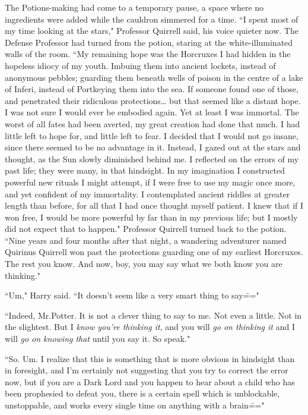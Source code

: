 The Potions-making had come to a temporary pause, a space where no ingredients were added while the cauldron simmered for a time. ``I spent most of my time looking at the stars," Professor Quirrell said, his voice quieter now. The Defense Professor had turned from the potion, staring at the white-illuminated walls of the room. ``My remaining hope was the Horcruxes I had hidden in the hopeless idiocy of my youth. Imbuing them into ancient lockets, instead of anonymous pebbles; guarding them beneath wells of poison in the centre of a lake of Inferi, instead of Portkeying them into the sea. If someone found one of those, and penetrated their ridiculous protections{\ldots} but that seemed like a distant hope. I was not sure I would ever be embodied again. Yet at least I was immortal. The worst of all fates had been averted, my great creation had done that much. I had little left to hope for, and little left to fear. I decided that I would not go insane, since there seemed to be no advantage in it. Instead, I gazed out at the stars and thought, as the Sun slowly diminished behind me. I reflected on the errors of my past life; they were many, in that hindsight. In my imagination I constructed powerful new rituals I might attempt, if I were free to use my magic once more, and yet confident of my immortality. I contemplated ancient riddles at greater length than before, for all that I had once thought myself patient. I knew that if I won free, I would be more powerful by far than in my previous life; but I mostly did not expect that to happen." Professor Quirrell turned back to the potion. ``Nine years and four months after that night, a wandering adventurer named Quirinus Quirrell won past the protections guarding one of my earliest Horcruxes. The rest you know. And now, boy, you may say what we both know you are thinking."

``Um," Harry said. ``It doesn't seem like a very smart thing to say\==="

``Indeed, Mr.\?Potter. It is not a clever thing to say to me. Not even a little. Not in the slightest. But I \emph{know you're thinking it}, and you will \emph{go on thinking it} and I will \emph{go on knowing that} until you say it. So speak."

``So. Um. I realize that this is something that is more obvious in hindsight than in foresight, and I'm certainly not suggesting that you try to correct the error now, but if you are a Dark Lord and you happen to hear about a child who has been prophesied to defeat you, there is a certain spell which is unblockable, unstoppable, and works every single time on anything with a brain\==="


